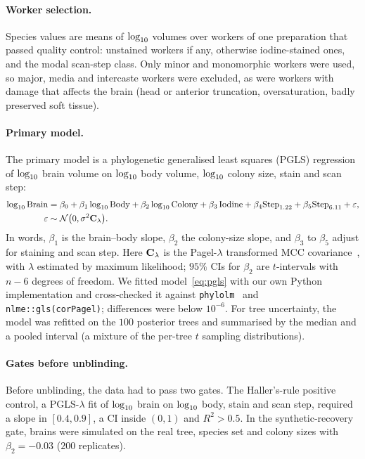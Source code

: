 \documentclass[11pt]{article}
\begin{document}
\paragraph{Worker selection.} Species values are means of $\log_{10}$ volumes over workers of one preparation that passed
quality control: unstained workers if any, otherwise iodine-stained ones, and the modal scan-step class. Only minor
and monomorphic workers were used, so major, media and intercaste workers were excluded, as were workers with damage
that affects the brain (head or anterior truncation, oversaturation, badly preserved soft tissue).

\paragraph{Primary model.} The primary model is a phylogenetic generalised least squares (PGLS) regression of $\log_{10}$
brain volume on $\log_{10}$ body volume, $\log_{10}$ colony size, stain and scan step:
\begin{equation}\label{eq:pgls}
\begin{split}
\log_{10}\mathrm{Brain} &= \beta_0 + \beta_1\log_{10}\mathrm{Body} + \beta_2\log_{10}\mathrm{Colony} + \beta_3\,\mathrm{Iodine}
  + \beta_4\mathrm{Step}_{1.22} + \beta_5\mathrm{Step}_{6.11} + \varepsilon,\\
\varepsilon &\sim \mathcal{N}\bigl(0,\sigma^2\mathbf{C}_{\lambda}\bigr).
\end{split}
\end{equation}
In words, $\beta_1$ is the brain--body slope, $\beta_2$ the colony-size slope, and $\beta_3$ to $\beta_5$ adjust for
staining and scan step. Here $\mathbf{C}_{\lambda}$ is the Pagel-$\lambda$ transformed MCC covariance~\citep{pagel1999,freckleton2002},
with $\lambda$ estimated by maximum likelihood; $95\%$ CIs for $\beta_2$ are $t$-intervals with $n - 6$ degrees of
freedom. We fitted model~\eqref{eq:pgls} with our own Python implementation and cross-checked it against
\texttt{phylolm}~\citep{ho2014} and \texttt{nlme::gls(corPagel)}; differences were below $10^{-6}$. For tree
uncertainty, the model was refitted on the $100$ posterior trees and summarised by the median and a pooled interval (a
mixture of the per-tree $t$ sampling distributions).

\paragraph{Gates before unblinding.} Before unblinding, the data had to pass two gates. The Haller's-rule positive
control, a PGLS-$\lambda$ fit of $\log_{10}$ brain on $\log_{10}$ body, stain and scan step, required a slope in
$[0.4, 0.9]$, a CI inside $(0, 1)$ and $R^2 > 0.5$. In the synthetic-recovery gate, brains were simulated on the real
tree, species set and colony sizes with $\beta_2 = -0.03$ ($200$ replicates).
\end{document}
